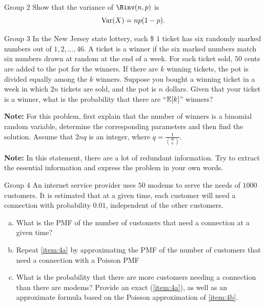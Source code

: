 \documentclass{article}
\begin{document}
\begin{problem}
    {Group 2}
    Show that the variance of $\Binv(n,p)$ is
    \[\mathop{\mathrm{Var}}\nolimits(X)=np(1-p).\]
\end{problem}

\begin{problem}
    {Group 3}
    In the New Jersey state lottery, each \$ $1$ ticket has six randomly marked numbers out of $1, 2, \dots , 46$. A ticket is a winner if the six marked numbers match six numbers drawn at random at the end of a week. For each ticket sold, $50$ cents are added to the pot for the winners. If there are $k$ winning tickets, the pot is divided equally among the $k$ winners. Suppose you bought a winning ticket in a week in which $2n$ tickets are sold, and the pot is $n$ dollars. Given that your ticket is a winner, what is the probability that there are ``$\E{k}$'' winners?

    \textbf{Note:} For this problem, first explain that the number of winners is a binomial random variable, determine the corresponding parameters and then find the solution. Assume that $2nq$ is an integer, where $q=\frac{1}{\binom{46}{6}}$.

    \textbf{Note:} In this statement, there are a lot of redundant information. Try to extract the essential information and express the problem in your own words.
\end{problem}

\begin{problem}
    {Group 4}
    An internet service provider uses $50$ modems to serve the needs of $1000$ customers. It is estimated that at a given time, each customer will need a connection with probability $0.0 1$, independent of the other customers.
    \begin{enumerate}[(a)]
        \item What is the PMF of the number of customers that need a connection at a given time?\label{item:4a}
        \item Repeat \cref{item:4a} by approximating the PMF of the number of customers that need a connection with a Poisson PMF\label{item:4b}
        \item What is the probability that there are more customers needing a connection than there are modems? Provide an exact (\cref{item:4a}), as well as an approximate formula based on the Poisson approximation of \cref{item:4b}.
    \end{enumerate}
\end{problem}
\end{document}
